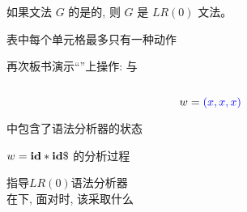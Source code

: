 \begin{frame}{}
  \begin{definition}[$LR(0)$文法]
    如果文法 $G$ 的是的,
    则 $G$ 是 $LR(0)$ 文法。
  \end{definition}

   \action{}表中每个单元格最多只有一种动作 \\[8pt]
\end{frame}

\begin{frame}{}
  \begin{center}
    再次板书演示``''上操作: 与

    \begin{columns}
        
    \end{columns}

    \[
      w = \textcolor{blue}{(x, x, x)}
    \]

    中包含了语法分析器的状态
  \end{center}
\end{frame}

\begin{frame}{}
  \begin{center}

    
  \end{center}
\end{frame}

\begin{frame}{}

  \begin{center}
    $w = \id \ast \id \$$ 的分析过程
  \end{center}
\end{frame}

\begin{frame}{}
  \begin{center}

    \vspace{0.30cm}

    \vspace{0.30cm}
    指导$LR(0)$语法分析器 \\[6pt]
    在下, 面对时, 该采取什么
  \end{center}
\end{frame}

